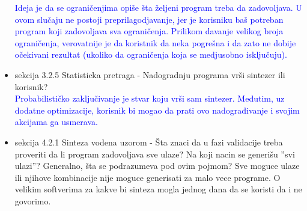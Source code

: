 \documentclass[a4paper]{report}
\newcommand{\odgovor}[1]{\textcolor{blue}{#1}}
\begin{document}
\begin{itemize}
    \odgovor {Ideja je da se ograničenjima opiše šta željeni program treba da zadovoljava. U ovom slučaju ne postoji preprilagodjavanje, jer je korisniku baš potreban program koji zadovoljava sva ograničenja. Prilikom davanje velikog broja ograničenja, verovatnije je da koristnik da neka pogrešna i da zato ne dobije očekivani rezultat (ukoliko da ograničenja koja se medjusobno isključuju).}
    \item sekcija 3.2.5 Statisticka pretraga - Nadogradnju programa vrši sintezer ili korisnik?\\
    \odgovor {Probabilističko zaključivanje je stvar koju vrši sam sintezer. Međutim, uz dodatne optimizacije, korisnik bi mogao da prati ovo nadograđivanje i svojim akcijama ga usmerava.}
    \item sekcija 4.2.1 Sinteza vodena uzorom - Šta znaci da u fazi validacije treba proveriti da li program zadovoljava sve ulaze? Na koji nacin se generišu ''svi ulazi''? Generalno, šta se podrazumeva pod ovim pojmom? Sve moguce ulaze ili njihove kombinacije nije moguce generisati za malo vece programe. O velikim softverima za kakve bi sinteza mogla jednog dana da se koristi da i ne govorimo.\\
\end{itemize}
\end{document}

